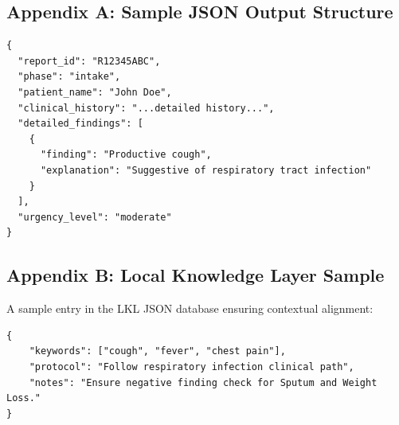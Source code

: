 \documentclass[12pt,a4paper]{article}
\begin{document}
\subsection*{Appendix A: Sample JSON Output Structure}
\begin{verbatim}
{
  "report_id": "R12345ABC",
  "phase": "intake",
  "patient_name": "John Doe",
  "clinical_history": "...detailed history...",
  "detailed_findings": [
    {
      "finding": "Productive cough",
      "explanation": "Suggestive of respiratory tract infection"
    }
  ],
  "urgency_level": "moderate"
}
\end{verbatim}

\subsection*{Appendix B: Local Knowledge Layer Sample}
A sample entry in the LKL JSON database ensuring contextual alignment:
\begin{verbatim}
{
    "keywords": ["cough", "fever", "chest pain"],
    "protocol": "Follow respiratory infection clinical path",
    "notes": "Ensure negative finding check for Sputum and Weight Loss."
}
\end{verbatim}
\end{document}
